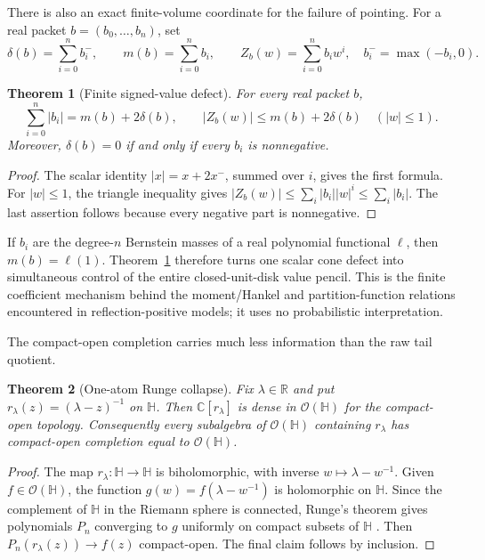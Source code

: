 \documentclass[11pt]{article}
\newtheorem{theorem}{Theorem}[section]
\theoremstyle{definition}
\theoremstyle{remark}
\newcommand{\C}{\mathbb C}
\newcommand{\R}{\mathbb R}
\newcommand{\cO}{\mathcal O}
\begin{document}
There is also an exact finite-volume coordinate for the failure of pointing.  For a real packet
\(b=(b_0,\ldots,b_n)\), set
\[
  \delta(b)=\sum_{i=0}^n b_i^- ,\qquad
  m(b)=\sum_{i=0}^n b_i,\qquad
  Z_b(w)=\sum_{i=0}^n b_iw^i,
  \quad b_i^-=\max(-b_i,0).
\]

\begin{theorem}[Finite signed-value defect]\label{thm:signed-value-defect}
For every real packet \(b\),
\[
  \sum_{i=0}^n|b_i|=m(b)+2\delta(b),
  \qquad
  |Z_b(w)|\leq m(b)+2\delta(b)\quad (|w|\leq1).
\]
Moreover, \(\delta(b)=0\) if and only if every \(b_i\) is nonnegative.
\end{theorem}

\begin{proof}
The scalar identity \(|x|=x+2x^-\), summed over \(i\), gives the first formula.
For \(|w|\leq1\), the triangle inequality gives
\( |Z_b(w)|\leq\sum_i|b_i||w|^i\leq\sum_i|b_i|\).
The last assertion follows because every negative part is nonnegative.
\end{proof}

If \(b_i\) are the degree-\(n\) Bernstein masses of a real polynomial functional
\(\ell\), then \(m(b)=\ell(1)\).  Theorem~\ref{thm:signed-value-defect} therefore turns one
scalar cone defect into simultaneous control of the entire closed-unit-disk value pencil.
This is the finite coefficient mechanism behind the moment/Hankel and partition-function
relations encountered in reflection-positive models; it uses no probabilistic interpretation.

The compact-open completion carries much less information than the raw tail quotient.

\begin{theorem}[One-atom Runge collapse]\label{thm:runge-collapse}
Fix \(\lambda\in\R\) and put \(r_\lambda(z)=(\lambda-z)^{-1}\) on \(\mathbb H\).
Then \(\C[r_\lambda]\) is dense in \(\cO(\mathbb H)\) for the compact-open topology.
Consequently every subalgebra of \(\cO(\mathbb H)\) containing \(r_\lambda\) has
compact-open completion equal to \(\cO(\mathbb H)\).
\end{theorem}

\begin{proof}
The map \(r_\lambda:\mathbb H\to\mathbb H\) is biholomorphic, with inverse
\(w\mapsto\lambda-w^{-1}\).  Given \(f\in\cO(\mathbb H)\), the function
\(g(w)=f(\lambda-w^{-1})\) is holomorphic on \(\mathbb H\).  Since the complement of
\(\mathbb H\) in the Riemann sphere is connected, Runge's theorem gives polynomials
\(P_n\) converging to \(g\) uniformly on compact subsets of \(\mathbb H\)
\cite[Chapter~VII]{Conway}.  Then \(P_n(r_\lambda(z))\to f(z)\) compact-open.  The final
claim follows by inclusion.
\end{proof}
\end{document}
